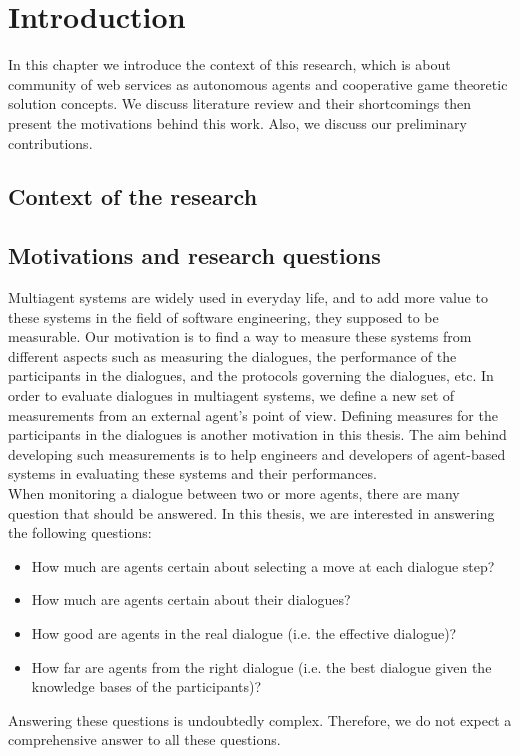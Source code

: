 \setcounter{chapter}{0}
\chapter{Introduction}\label{sec:intro}
In this chapter we introduce the context of this research, which is about community of web services as autonomous agents and cooperative game theoretic solution concepts. We discuss literature review and their shortcomings then present the motivations behind this work. Also, we discuss our preliminary contributions. 

\section{Context of the research}\label{sec:context}


\section{Motivations and research questions}\label{sec:motivation}

Multiagent systems are widely used in everyday life, and to add more value to these systems in the field of software engineering,
they supposed to be measurable. Our motivation is to find a way to measure these systems from different aspects such as measuring
the dialogues, the performance of the participants in the dialogues, and the protocols governing the dialogues, etc. In order to evaluate
dialogues in multiagent systems, we define a new set of measurements from an external agent's point of view. Defining measures for the
participants in the dialogues is another motivation in this thesis. The aim behind developing such measurements is to help engineers and
developers of agent-based systems in evaluating these systems and their performances.\\

\indent When monitoring a dialogue between two or more agents, there are many question that should be answered. In this thesis, we are interested in answering the following questions:

\begin{itemize}
\item How much are agents certain about selecting a move at each dialogue step?
\item How much are agents certain about their dialogues?
\item How good are agents in the real dialogue (i.e. the effective dialogue)?
\item How far are agents from the right dialogue (i.e. the best dialogue given the knowledge bases of the participants)?
\end{itemize}
Answering these questions is undoubtedly complex. Therefore, we do not expect a comprehensive answer to all these questions.



